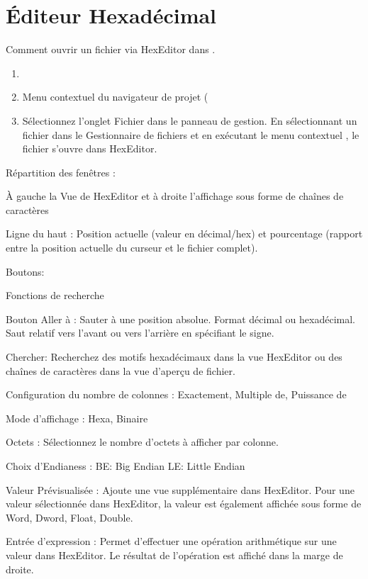 \section{Éditeur Hexadécimal}\label{sec:hexeditor}

Comment ouvrir un fichier via HexEditor dans \codeblocks.

\begin{enumerate}
\item {}
\item Menu contextuel du navigateur de projet (
\item Sélectionnez l'onglet Fichier dans le panneau de gestion. En sélectionnant un fichier dans le Gestionnaire de fichiers et en exécutant le menu contextuel , le fichier s'ouvre dans HexEditor.
\end{enumerate}

Répartition des fenêtres :

À gauche la Vue de HexEditor et à droite l'affichage sous forme de chaînes de caractères

Ligne du haut :
Position actuelle (valeur en décimal/hex) et pourcentage (rapport entre la position actuelle du curseur et le fichier complet).

Boutons:

Fonctions de recherche

Bouton Aller à : Sauter à une position absolue. Format décimal ou hexadécimal. Saut relatif vers l'avant ou vers l'arrière en spécifiant le signe.

Chercher: Recherchez des motifs hexadécimaux dans la vue HexEditor ou des chaînes de caractères dans la vue d'aperçu de fichier.

Configuration du nombre de colonnes :
Exactement, Multiple de, Puissance de

Mode d'affichage :
Hexa, Binaire

Octets :
Sélectionnez le nombre d'octets à afficher par colonne.

Choix d'Endianess :
BE: Big Endian
LE: Little Endian

Valeur Prévisualisée :
Ajoute une vue supplémentaire dans HexEditor. Pour une valeur sélectionnée dans HexEditor, la valeur est également affichée sous forme de Word, Dword, Float, Double.

Entrée d'expression :
Permet d'effectuer une opération arithmétique sur une valeur dans HexEditor. Le résultat de l'opération est affiché dans la marge de droite.

